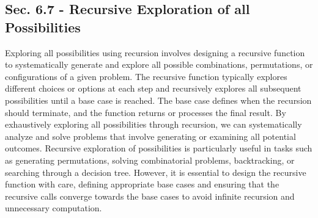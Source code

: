 \subsection*{Sec. 6.7 - Recursive Exploration of all Possibilities}

Exploring all possibilities using recursion involves designing a recursive function to systematically generate and explore all possible combinations, permutations, or configurations of a given problem. The recursive function typically explores different choices or options at each step and recursively explores all subsequent possibilities until a base 
case is reached. The base case defines when the recursion should terminate, and the function returns or processes the final result. By exhaustively exploring all possibilities through recursion, we can systematically analyze and solve problems that involve generating or examining all potential outcomes. Recursive exploration of possibilities is particularly 
useful in tasks such as generating permutations, solving combinatorial problems, backtracking, or searching through a decision tree. However, it is essential to design the recursive function with care, defining appropriate base cases and ensuring that the recursive calls converge towards the base cases to avoid infinite recursion and unnecessary computation.

